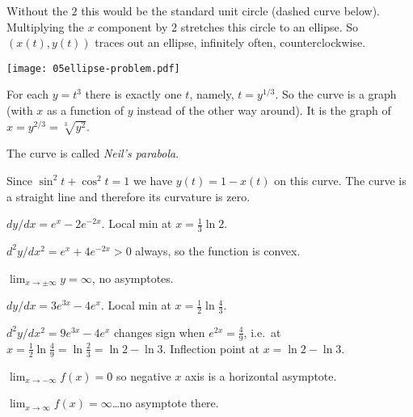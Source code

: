 \item[{\bfseries(V16.1h)}]
Without the $2$ this would be the standard unit circle (dashed curve below).
Multiplying the $x$ component by $2$ stretches this circle to an ellipse.  So
$(x(t), y(t))$ traces out an ellipse, infinitely often, counterclockwise.




\begin{center}
  \texttt{[image: 05ellipse-problem.pdf]}
\end{center}




\bigskip

\item[{\bfseries(V16.1i)}]
For each $y=t^3$ there is exactly one $t$, namely, $t=y^{1/3}$.  So the curve is
a graph (with $x$ as a function of $y$ instead of the other way around).  It
is the graph of $x=y^{2/3} = \sqrt[3]{y^2}$.
\begin{center}
  
\end{center}
The curve is called \emph{Neil's parabola}.
\bigskip

\item[{\bfseries(V16.6)}]
Since $\sin^2t + \cos^2 t =1$ we have $y(t) = 1-x(t)$ on this curve.  The curve
is a straight line and therefore its curvature is zero.
\bigskip

\item[{\bfseries(VI9.3)}]
$dy/dx = e^x - 2e^{-2x}$. Local min at $x = \frac13 \ln 2$.




$d^2y/dx^2 = e^x+4e^{-2x}>0$ always, so the function is convex.




$\lim_{x\to\pm\infty} y=\infty$, no asymptotes.
\bigskip

\item[{\bfseries(VI9.4)}]
$dy/dx = 3e^{3x} - 4 e^x$. Local min at $x=\frac12\ln\frac43$.




$d^2y/dx^2 = 9e^{3x} - 4e^{x}$ changes sign when $e^{2x} = \frac49$,
i.e.~at $x=\frac12\ln\frac49 = \ln\frac23 = \ln2-\ln3$.  Inflection
point at $x=\ln2-\ln 3$.




$\lim_{x\to-\infty}f(x) = 0$ so negative $x$ axis is a horizontal
asymptote.




$\lim_{x\to\infty}f(x) = \infty$\ldots no asymptote there.
\bigskip

